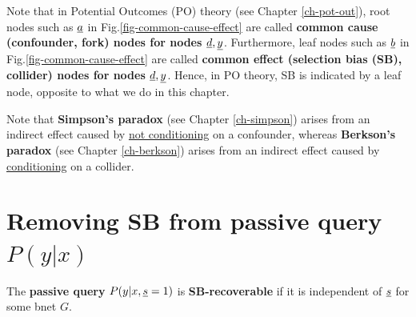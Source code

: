 Note
that in Potential
Outcomes (PO) theory
 (see Chapter \ref{ch-pot-out}),
root nodes such
as ${\underline{a}}$ in
Fig.\ref{fig-common-cause-effect}
are called {\bf common cause
 (confounder, fork) nodes
for nodes ${\underline{d}}, {\underline{y}}$}.
Furthermore, leaf nodes such as 
${\underline{b}}$ in
Fig.\ref{fig-common-cause-effect} are 
called 
{\bf common effect
(selection bias (SB), collider) nodes
for nodes ${\underline{d}}, {\underline{y}}$}.
Hence, in PO theory,
SB is indicated
by
a leaf node,
opposite to 
what we do in this chapter.

Note that 
{\bf Simpson's paradox} (see Chapter
\ref{ch-simpson}) arises from an indirect effect
caused by \ul{not conditioning} 
on a confounder,
whereas 
{\bf Berkson's paradox}
(see Chapter \ref{ch-berkson})
arises from an indirect effect
caused by \ul{conditioning}
on a collider.



\section{Removing SB from 
passive query $P(y|x)$}

The {\bf  passive query} $P(y|x, {\underline{s}}=1)$
is {\bf SB-recoverable}
if it is independent of ${\underline{s}}$
for some bnet $G$.







